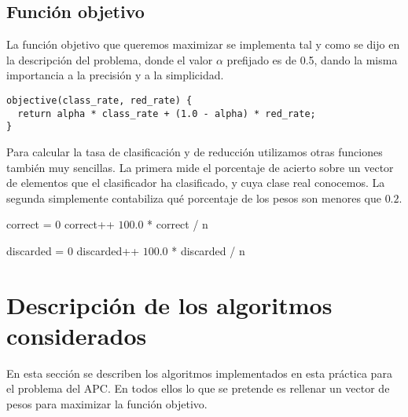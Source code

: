 \documentclass[12pt]{article}
\begin{document}
\subsection*{{\color{red}Función objetivo}}

La función objetivo que queremos maximizar se implementa tal y como se dijo en la descripción del problema, donde el valor $\alpha$ prefijado es de 0.5, dando la misma importancia a la precisión y a la simplicidad.

\begin{verbatim}
objective(class_rate, red_rate) {
  return alpha * class_rate + (1.0 - alpha) * red_rate;
}
\end{verbatim}

Para calcular la tasa de clasificación y de reducción utilizamos otras funciones también muy sencillas. La primera mide el porcentaje de acierto sobre un vector de elementos que el clasificador ha clasificado, y cuya clase real conocemos. La segunda simplemente contabiliza qué porcentaje de los pesos son menores que $0.2$.

\begin{algorithm}[h]
\begin{algorithmic}

    \State correct = $0$
      
            \State correct++
        \EndIf
    \EndFor
    \State \Return $100.0$ * correct / n
\EndFunction
  
\end{algorithmic}
\end{algorithm}

\begin{algorithm}[h]
\begin{algorithmic}

    \State discarded = $0$
      
            \State discarded++
        \EndIf       
    \EndFor
    \State \Return $100.0$ * discarded / n
\EndFunction
  
\end{algorithmic}
\end{algorithm}

\newpage
\section{Descripción de los algoritmos considerados}
En esta sección se describen los algoritmos implementados en esta práctica para el problema del APC. En todos ellos lo que se pretende es rellenar un vector de pesos para maximizar la función objetivo.
\end{document}
